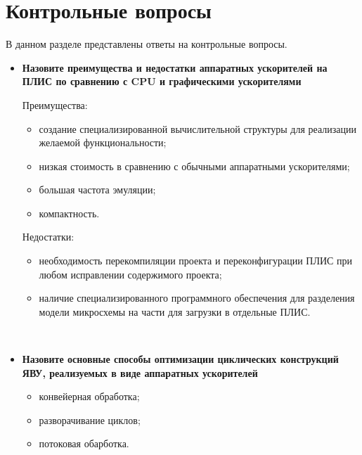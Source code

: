 \chapter{Контрольные вопросы}

В данном разделе представлены ответы на контрольные вопросы.

\noindent
\begin{itemize}[left=-0.5\parindent]
    \item \textbf{Назовите преимущества и недостатки аппаратных ускорителей на
          ПЛИС по сравнению с CPU и графическими ускорителями}

        Преимущества:
        \begin{itemize}
            \item создание специализированной вычислительной структуры для
                  реализации желаемой функциональности;
            \item низкая стоимость в сравнению с обычными аппаратными
                  ускорителями;
            \item большая частота эмуляции;
            \item компактность.
        \end{itemize}

        Недостатки:
        \begin{itemize}
            \item необходимость перекомпиляции проекта и переконфигурации ПЛИС
                  при любом исправлении содержимого проекта;
            \item наличие специализированного программного обеспечения для
                  разделения модели микросхемы на части для загрузки в
                  отдельные ПЛИС.
        \end{itemize}
        ~\\

    \item \textbf{Назовите основные способы оптимизации циклических конструкций
          ЯВУ, реализуемых в виде аппаратных ускорителей}
        \begin{itemize}[leftmargin=\parindent]
            \item конвейерная обработка;
            \item разворачивание циклов;
            \item потоковая обарботка.
        \end{itemize}
        ~\\


\end{itemize}
